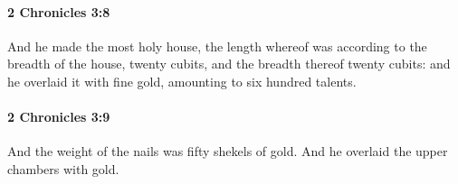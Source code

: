 		\paragraph{2 Chronicles 3:8} %
			\label{2CHRONICLES-3-8}

			And he made the most holy house, the length whereof was according to the breadth of the house, twenty cubits, and the breadth thereof twenty cubits: and he overlaid it with fine gold, amounting to six hundred talents.


		\paragraph{2 Chronicles 3:9} %
			\label{2CHRONICLES-3-9}

			And the weight of the nails was fifty shekels of gold. And he overlaid the upper chambers with gold.


